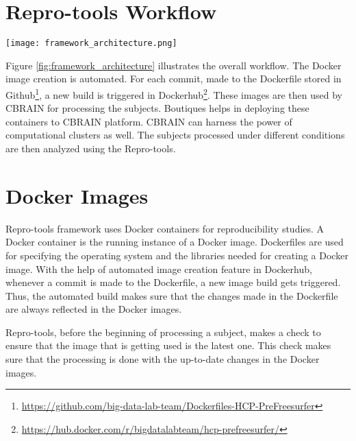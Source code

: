 \section{Repro-tools Workflow}\label{workflow}
\begin{center}
\texttt{[image: framework\_architecture.png]}
\label{fig:framework_architecture}
\end{center}
\vskip 0.2in

Figure \ref{fig:framework_architecture} illustrates the overall workflow. The Docker image creation is automated. For each commit, made to the Dockerfile stored in Github\footnote{\url{https://github.com/big-data-lab-team/Dockerfiles-HCP-PreFreesurfer}}, a new build is triggered in Dockerhub\footnote{\url{https://hub.docker.com/r/bigdatalabteam/hcp-prefreesurfer/}}. These images are then used by CBRAIN for processing the subjects. Boutiques helps in deploying these containers to CBRAIN platform. CBRAIN can harness the power of computational clusters as well. The subjects processed under different conditions are then analyzed using the Repro-tools.

\section{Docker Images}\label{docker_images}
Repro-tools framework uses Docker containers for reproducibility 
studies. A Docker container is the running instance of a Docker image. 
Dockerfiles are used for specifying the operating system and the 
libraries needed for creating a Docker image. With the help of 
automated image creation feature in Dockerhub, whenever a commit is 
made to the Dockerfile, a new image build gets triggered.
Thus, the automated build makes sure that the changes made in the Dockerfile are always reflected in the Docker images.

Repro-tools, before the beginning of processing a subject, makes a check to ensure that the image that is getting used is the latest one. This check makes sure that the processing is done with the up-to-date changes in the Docker images.



